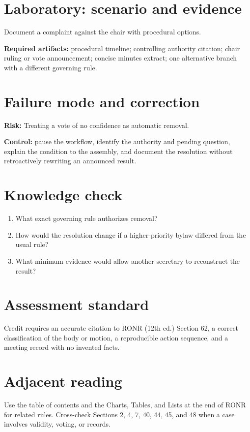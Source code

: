\documentclass[11pt]{article}
\begin{document}
\section{Laboratory: scenario and evidence}
Document a complaint against the chair with procedural options.

\textbf{Required artifacts:} procedural timeline; controlling authority citation; chair ruling or vote announcement; concise minutes extract; one alternative branch with a different governing rule.

\section{Failure mode and correction}
\textbf{Risk:} Treating a vote of no confidence as automatic removal.

\textbf{Control:} pause the workflow, identify the authority and pending question, explain the condition to the assembly, and document the resolution without retroactively rewriting an announced result.

\section{Knowledge check}
\begin{enumerate}[leftmargin=*,itemsep=4pt]
\item What exact governing rule authorizes removal?
\item How would the resolution change if a higher-priority bylaw differed from the usual rule?
\item What minimum evidence would allow another secretary to reconstruct the result?
\end{enumerate}

\section{Assessment standard}
Credit requires an accurate citation to RONR (12th ed.) Section 62, a correct classification of the body or motion, a reproducible action sequence, and a meeting record with no invented facts.

\section{Adjacent reading}
Use the table of contents and the Charts, Tables, and Lists at the end of RONR for related rules. Cross-check Sections 2, 4, 7, 40, 44, 45, and 48 when a case involves validity, voting, or records.
\end{document}
